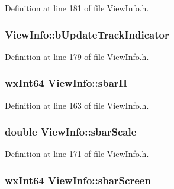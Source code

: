 Definition at line 181 of file View\+Info.\+h.

\subsubsection[{\texorpdfstring{b\+Update\+Track\+Indicator}{bUpdateTrackIndicator}}]{ View\+Info\+::b\+Update\+Track\+Indicator}\hypertarget{class_view_info_a32de00c7e8d82498b5f34b792fb51b94}{}\label{class_view_info_a32de00c7e8d82498b5f34b792fb51b94}


Definition at line 179 of file View\+Info.\+h.

\subsubsection[{\texorpdfstring{sbarH}{sbarH}}]{\setlength{\rightskip}{0pt plus 5cm}wx\+Int64 View\+Info\+::sbarH}\hypertarget{class_view_info_a9c7d7713ca391730718f032a0aabcdb7}{}\label{class_view_info_a9c7d7713ca391730718f032a0aabcdb7}


Definition at line 163 of file View\+Info.\+h.

\subsubsection[{\texorpdfstring{sbar\+Scale}{sbarScale}}]{\setlength{\rightskip}{0pt plus 5cm}double View\+Info\+::sbar\+Scale}\hypertarget{class_view_info_aa7eac35c75a03b3c37b8ec89b736a7a8}{}\label{class_view_info_aa7eac35c75a03b3c37b8ec89b736a7a8}


Definition at line 171 of file View\+Info.\+h.

\subsubsection[{\texorpdfstring{sbar\+Screen}{sbarScreen}}]{\setlength{\rightskip}{0pt plus 5cm}wx\+Int64 View\+Info\+::sbar\+Screen}\hypertarget{class_view_info_a869d52a5605fbb274c89239ee1b966a6}{}\label{class_view_info_a869d52a5605fbb274c89239ee1b966a6}


